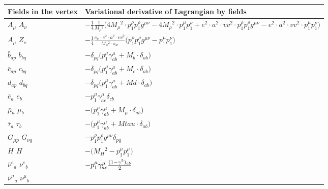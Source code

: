 \textwidth 17cm
\textheight 25cm
\hoffset -3cm
\voffset -1cm
\pagestyle{empty}

\begin{center}

\begin{tabular}{|l|l|} \hline
Fields in the vertex & Variational derivative of Lagrangian by fields \\ \hline
${A}_{\mu }$ \phantom{-} ${A}_{\nu }$ \phantom{-}  &
	$-\frac{1}{4}\frac{1}{ M_{\rho}{}^2 }\big(4 M_{\rho}{}^2 \cdot p_1^\rho p_1^\rho g^{\mu \nu} -4 M_{\rho}{}^2 \cdot p_1^\mu p_1^\nu + e{}^2 \cdot  a{}^2 \cdot  vv{}^2 \cdot p_1^\rho p_1^\rho g^{\mu \nu} - e{}^2 \cdot  a{}^2 \cdot  vv{}^2 \cdot p_1^\mu p_1^\nu \big)$\\[2mm]
${A}_{\mu }$ \phantom{-} ${Z}_{\nu }$ \phantom{-}  &
	$-\frac{1}{4}\frac{ c_w \cdot e{}^2  \cdot a{}^2  \cdot vv{}^2 }{ M_{\rho}{}^2  \cdot s_w}\big(p_1^\rho p_1^\rho g^{\mu \nu} -p_1^\mu p_1^\nu \big)$\\[2mm]
$\bar{b}{}_{a p }$ \phantom{-} $b{}_{b q }$ \phantom{-}  &
	$-\delta_{p q} \big(p_1^\mu \gamma_{a b}^\mu + M_b\cdot \delta_{a b} \big)$\\[2mm]
$\bar{c}{}_{a p }$ \phantom{-} $c{}_{b q }$ \phantom{-}  &
	$-\delta_{p q} \big(p_1^\mu \gamma_{a b}^\mu + M_c\cdot \delta_{a b} \big)$\\[2mm]
$\bar{d}{}_{a p }$ \phantom{-} $d{}_{b q }$ \phantom{-}  &
	$-\delta_{p q} \big(p_1^\mu \gamma_{a b}^\mu + Md\cdot \delta_{a b} \big)$\\[2mm]
$\bar{e}{}_{a }$ \phantom{-} $e{}_{b }$ \phantom{-}  &
	$-p_1^\mu \gamma_{a c}^\mu \delta_{c b} $\\[2mm]
$\bar{\mu}{}_{a }$ \phantom{-} $\mu{}_{b }$ \phantom{-}  &
	$-\big(p_1^\mu \gamma_{a b}^\mu + M_\mu\cdot \delta_{a b} \big)$\\[2mm]
$\bar{\tau}{}_{a }$ \phantom{-} $\tau{}_{b }$ \phantom{-}  &
	$-\big(p_1^\mu \gamma_{a b}^\mu + Mtau\cdot \delta_{a b} \big)$\\[2mm]
${G}_{\mu p }$ \phantom{-} ${G}_{\nu q }$ \phantom{-}  &
	$-p_1^\rho p_1^\rho g^{\mu \nu} \delta_{p q} $\\[2mm]
${H}_{}$ \phantom{-} ${H}_{}$ \phantom{-}  &
	$-\big( M_H{}^2 -p_1^\mu p_1^\mu \big)$\\[2mm]
$\bar{\nu}^e{}_{a }$ \phantom{-} $\nu^e{}_{b }$ \phantom{-}  &
	$-p_1^\mu \gamma_{a c}^\mu {(1-\gamma^5)_{c b}\over 2} $\\[2mm]
$\bar{\nu}^\mu{}_{a }$ \phantom{-} $\nu^\mu{}_{b }$ \phantom{-}  &

\end{tabular}
\end{center}
